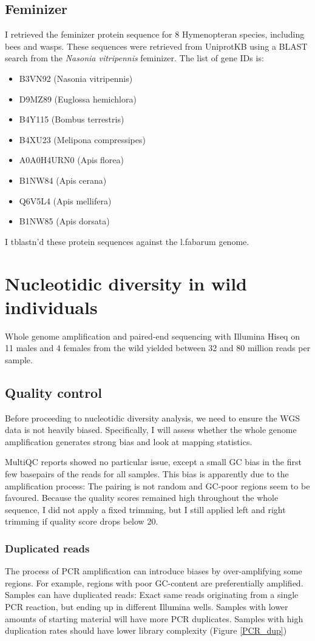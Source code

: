 \documentclass[10pt,a4paper]{report}
\begin{document}
\section{Feminizer}
I retrieved the feminizer protein sequence for 8 Hymenopteran species, including bees and wasps. These sequences were retrieved from UniprotKB using a BLAST search from the \textit{Nasonia vitripennis} feminizer. The list of gene IDs is: 
\begin{itemize}
\item B3VN92 (Nasonia vitripennis)
\item D9MZ89 (Euglossa hemichlora)
\item B4Y115 (Bombus terrestris)
\item B4XU23 (Melipona compressipes)
\item A0A0H4URN0 (Apis florea)
\item B1NW84 (Apis cerana)
\item Q6V5L4 (Apis mellifera)
\item B1NW85 (Apis dorsata)
\end{itemize}

I tblastn'd these protein sequences against the l.fabarum genome.

\chapter{Nucleotidic diversity in wild individuals}
Whole genome amplification and paired-end sequencing with Illumina Hiseq on 11 males and 4 females from the wild yielded between 32 and 80 million reads per sample.

\section{Quality control}
Before proceeding to nucleotidic diversity analysis, we need to ensure the WGS data is not heavily biased. Specifically, I will assess whether the whole genome amplification generates strong bias and look at mapping statistics.

MultiQC reports showed no particular issue, except a small GC bias in the first few basepairs of the reads for all samples. This bias is apparently due to the amplification process: The pairing is not random and GC-poor regions seem to be favoured. Because the quality scores remained high throughout the whole sequence, I did not apply a fixed trimming, but I still applied left and right trimming if quality score drops below 20.

\subsection{Duplicated reads}
The process of PCR amplification can introduce biases by over-amplifying some regions. For example, regions with poor GC-content are preferentially amplified. Samples can have duplicated reads: Exact same reads originating from a single PCR reaction, but ending up in different Illumina wells. Samples with lower amounts of starting material will have more PCR duplicates. Samples with high duplication rates should have lower library complexity (Figure \ref{PCR_dup})
\end{document}
